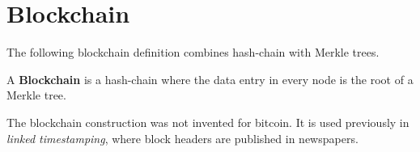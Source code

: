 
\section{Blockchain}
The following blockchain definition combines hash-chain with Merkle trees. 


\begin{definition}\label{def:bc}
A \textbf{Blockchain} is a hash-chain where the data entry in every node is the root of a Merkle tree.
\end{definition}

\begin{note}
	The blockchain construction was not invented for bitcoin. It is used previously in \emph{linked timestamping}, where block headers are published in newspapers.
\end{note}

